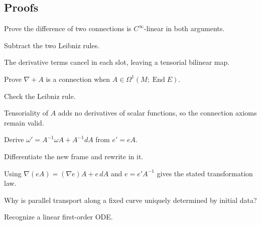 \subsection*{Proofs}

\begin{exercise}\label{exr:vii21-ped-06}
Prove the difference of two connections is \(C^\infty\)-linear in both arguments.
\end{exercise}

\begin{hint}
Subtract the two Leibniz rules.
\end{hint}

\begin{solution}
The derivative terms cancel in each slot, leaving a tensorial bilinear map.
\end{solution}

\begin{exercise}\label{exr:vii21-ped-07}
Prove \(\nabla+A\) is a connection when \(A\in\Omega^1(M;\operatorname{End}E)\).
\end{exercise}

\begin{hint}
Check the Leibniz rule.
\end{hint}

\begin{solution}
Tensoriality of \(A\) adds no derivatives of scalar functions, so the connection axioms remain valid.
\end{solution}

\begin{exercise}\label{exr:vii21-ped-08}
Derive \(\omega'=A^{-1}\omega A+A^{-1}dA\) from \(e'=eA\).
\end{exercise}

\begin{hint}
Differentiate the new frame and rewrite in it.
\end{hint}

\begin{solution}
Using \(\nabla(eA)=(\nabla e)A+e\,dA\) and \(e=e'A^{-1}\) gives the stated transformation law.
\end{solution}

\begin{exercise}\label{exr:vii21-ped-09}
Why is parallel transport along a fixed curve uniquely determined by initial data?
\end{exercise}

\begin{hint}
Recognize a linear first-order ODE.
\end{hint}

